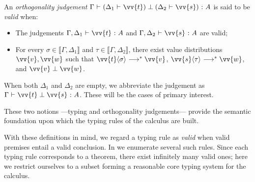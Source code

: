 \documentclass[runningheads,orivec,envcountsame,envcountsect]{llncs}
\newcommand\lra{\longrightarrow}
\newcommand\ansubst[2]{\ensuremath{\langle #1 \rangle_{#2}}}
\def\scal#1#2{\langle{#1}~|~{#2}\rangle}
\def\eval{\lra^*}
\def\sem#1{\llbracket#1\rrbracket}
\def\TYP#1#2#3{#1~{\vdash}~#2~{:}~#3}
\def\SORTH#1#2#3#4{#1~{\vdash}~#2\perp#3~{:}~#4}
\def\ORTH#1#2#3#4#5#6{#1~{\vdash}~(#2~{\vdash}~#3)\perp(#4~{\vdash}~#5)~{:}~#6}
\newcommand\B{\mathbb B}
\newcommand\XB{\mathbb X}
\newcommand\basis[1]{\ensuremath{\mathsf{B}_{#1}}}
\begin{document}
\begin{definition}
  An \emph{orthogonality judgement}
  $\ORTH{\Gamma}{\Delta_1}{\vv{t}}{\Delta_2}{\vv{s}}{A}$
  is said to be \emph{valid} when:
  \begin{itemize}
    \item The judgements
      $\TYP{\Gamma,\Delta_1}{\vv{t}}{A}$ and
      $\TYP{\Gamma,\Delta_2}{\vv{s}}{A}$ are valid;
    \item For every
      $\sigma\in\sem{\Gamma,\Delta_1}$ and
      $\tau\in\sem{\Gamma,\Delta_2}$,
      there exist value distributions $\vv{v},\vv{w}$ such that
      $\vv{t}\ansubst{\sigma}{}\eval\vv{v}$,
      $\vv{s}\ansubst{\tau}{}\eval\vv{w}$,
      and $\vv{v}\perp\vv{w}$.
  \end{itemize}
\end{definition}

When both $\Delta_1$ and $\Delta_2$ are empty,
we abbreviate the judgement as
$\SORTH{\Gamma}{\vv{t}}{\vv{s}}{A}$.
These will be the cases of primary interest.

These two notions ---typing and orthogonality judgements--- provide the
semantic foundation upon which the typing rules of the calculus are built.


With these definitions in mind, we regard a typing rule as \emph{valid} when
valid premises entail a valid conclusion.  
In  we enumerate several such rules.  
Since each typing rule corresponds to a theorem, there exist infinitely many
valid ones; here we restrict ourselves to a subset forming a reasonable core
typing system for the calculus.
\end{document}
